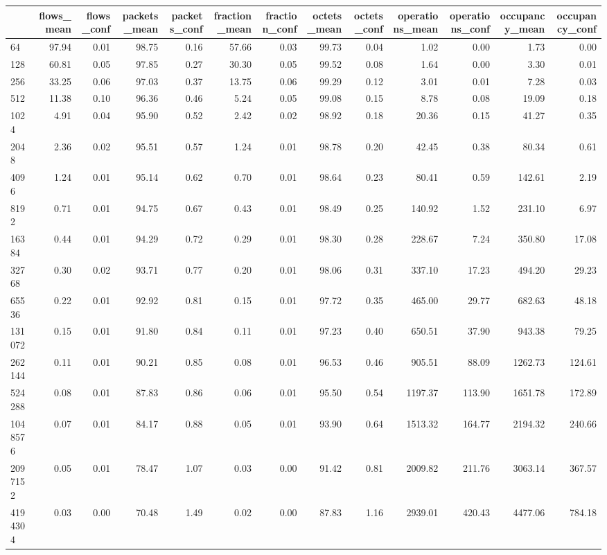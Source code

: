 \begin{tabular}{lrrrrrrrrrrrr}
\toprule
 & flows_mean & flows_conf & packets_mean & packets_conf & fraction_mean & fraction_conf & octets_mean & octets_conf & operations_mean & operations_conf & occupancy_mean & occupancy_conf \\
\midrule
64 & 97.94 & 0.01 & 98.75 & 0.16 & 57.66 & 0.03 & 99.73 & 0.04 & 1.02 & 0.00 & 1.73 & 0.00 \\
128 & 60.81 & 0.05 & 97.85 & 0.27 & 30.30 & 0.05 & 99.52 & 0.08 & 1.64 & 0.00 & 3.30 & 0.01 \\
256 & 33.25 & 0.06 & 97.03 & 0.37 & 13.75 & 0.06 & 99.29 & 0.12 & 3.01 & 0.01 & 7.28 & 0.03 \\
512 & 11.38 & 0.10 & 96.36 & 0.46 & 5.24 & 0.05 & 99.08 & 0.15 & 8.78 & 0.08 & 19.09 & 0.18 \\
1024 & 4.91 & 0.04 & 95.90 & 0.52 & 2.42 & 0.02 & 98.92 & 0.18 & 20.36 & 0.15 & 41.27 & 0.35 \\
2048 & 2.36 & 0.02 & 95.51 & 0.57 & 1.24 & 0.01 & 98.78 & 0.20 & 42.45 & 0.38 & 80.34 & 0.61 \\
4096 & 1.24 & 0.01 & 95.14 & 0.62 & 0.70 & 0.01 & 98.64 & 0.23 & 80.41 & 0.59 & 142.61 & 2.19 \\
8192 & 0.71 & 0.01 & 94.75 & 0.67 & 0.43 & 0.01 & 98.49 & 0.25 & 140.92 & 1.52 & 231.10 & 6.97 \\
16384 & 0.44 & 0.01 & 94.29 & 0.72 & 0.29 & 0.01 & 98.30 & 0.28 & 228.67 & 7.24 & 350.80 & 17.08 \\
32768 & 0.30 & 0.02 & 93.71 & 0.77 & 0.20 & 0.01 & 98.06 & 0.31 & 337.10 & 17.23 & 494.20 & 29.23 \\
65536 & 0.22 & 0.01 & 92.92 & 0.81 & 0.15 & 0.01 & 97.72 & 0.35 & 465.00 & 29.77 & 682.63 & 48.18 \\
131072 & 0.15 & 0.01 & 91.80 & 0.84 & 0.11 & 0.01 & 97.23 & 0.40 & 650.51 & 37.90 & 943.38 & 79.25 \\
262144 & 0.11 & 0.01 & 90.21 & 0.85 & 0.08 & 0.01 & 96.53 & 0.46 & 905.51 & 88.09 & 1262.73 & 124.61 \\
524288 & 0.08 & 0.01 & 87.83 & 0.86 & 0.06 & 0.01 & 95.50 & 0.54 & 1197.37 & 113.90 & 1651.78 & 172.89 \\
1048576 & 0.07 & 0.01 & 84.17 & 0.88 & 0.05 & 0.01 & 93.90 & 0.64 & 1513.32 & 164.77 & 2194.32 & 240.66 \\
2097152 & 0.05 & 0.01 & 78.47 & 1.07 & 0.03 & 0.00 & 91.42 & 0.81 & 2009.82 & 211.76 & 3063.14 & 367.57 \\
4194304 & 0.03 & 0.00 & 70.48 & 1.49 & 0.02 & 0.00 & 87.83 & 1.16 & 2939.01 & 420.43 & 4477.06 & 784.18 \\

\end{tabular}
